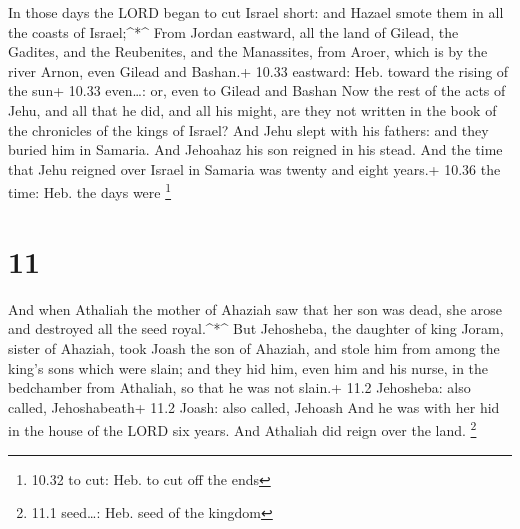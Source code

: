  In those days the LORD began to cut Israel short: and
Hazael smote them in all the coasts of Israel;\^{}*\^{} 
From Jordan eastward, all the land of Gilead, the Gadites, and the
Reubenites, and the Manassites, from Aroer, which is by the river Arnon,
even Gilead and Bashan.+ 10.33 eastward: Heb. toward the rising of the
sun+ 10.33 even\ldots: or, even to Gilead and Bashan  Now
the rest of the acts of Jehu, and all that he did, and all his might,
are they not written in the book of the chronicles of the kings of
Israel?  And Jehu slept with his fathers: and they buried
him in Samaria. And Jehoahaz his son reigned in his stead. 
And the time that Jehu reigned over Israel in Samaria was twenty and
eight years.+ 10.36 the time: Heb. the days were \footnote{10.32 to cut:
  Heb. to cut off the ends}

\hypertarget{section-10}{%
\section{11}\label{section-10}}

 And when Athaliah the mother of Ahaziah saw that her son
was dead, she arose and destroyed all the seed royal.\^{}*\^{}
 But Jehosheba, the daughter of king Joram, sister of
Ahaziah, took Joash the son of Ahaziah, and stole him from among the
king's sons which were slain; and they hid him, even him and his nurse,
in the bedchamber from Athaliah, so that he was not slain.+ 11.2
Jehosheba: also called, Jehoshabeath+ 11.2 Joash: also called, Jehoash
 And he was with her hid in the house of the LORD six years.
And Athaliah did reign over the land. \footnote{11.1 seed\ldots: Heb.
  seed of the kingdom}

